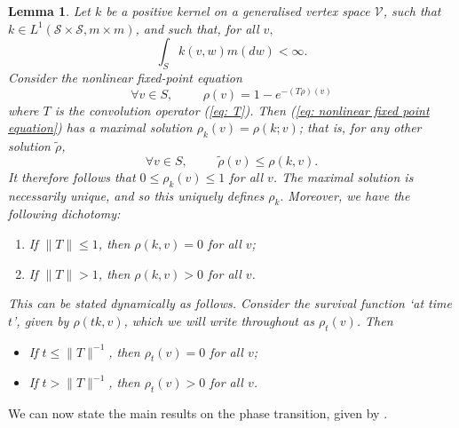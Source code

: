 \documentclass[11pt, notitlepage]{article}
\newtheorem{lem}[thm]{Lemma}
\begin{document}
   \begin{lem}\label{lemma: survival function}
       Let $k$ be a positive kernel on a generalised vertex space $\mathcal{V}$, such that $k \in L^1(\mathcal{S}\times \mathcal{S}, m \times m)$, and such that, for all $v,$ \begin{equation} \label{eq: BJR 51}
           \int_S k(v,w)m(dw)<\infty.
       \end{equation} Consider the nonlinear fixed-point equation 
      \begin{equation} \label{eq: nonlinear fixed point equation} 
        \forall v \in S,\hspace{1cm}  {\rho}(v)=1-e^{-(T{\rho})(v)}
      \end{equation} where $T$ is the convolution operator (\ref{eq: T}). Then (\ref{eq: nonlinear fixed point equation}) has a maximal solution $\rho_k(v)=\rho(k;v)$; that is, for any other solution $\tilde{\rho}$, \begin{equation}
          \forall v \in S, \hspace{1cm} \tilde{\rho}(v)\leq \rho(k,v).
      \end{equation} It therefore follows that $0\leq \rho_k(v)\leq 1$ for all $v$. The maximal solution is necessarily unique, and so this uniquely defines $\rho_k.$ Moreover, we have the following dichotomy:
      \begin{enumerate}[label=\roman{*}).]
          \item If $\|T\|\leq 1$, then $\rho(k, v)=0$ for all $v$;
          \item If $\|T\|> 1$, then $\rho(k, v)>0$ for all $v$.
      \end{enumerate} This can be stated dynamically as follows. Consider the survival function `at time $t$', given by $\rho(tk,v)$, which we will write throughout as $\rho_t(v)$. Then 
      \begin{itemize}
          \item If $t\leq \|T\|^{-1}$, then $\rho_t(v)=0$ for all $v$;
          \item If $t>\|T\|^{-1}$, then $\rho_t(v)>0$ for all $v$.
      \end{itemize}
      
   \end{lem} We can now state the main results on the phase transition, given by \cite[Theorem 3.1 and Corollary 3.2]{BJR07}.
\end{document}
